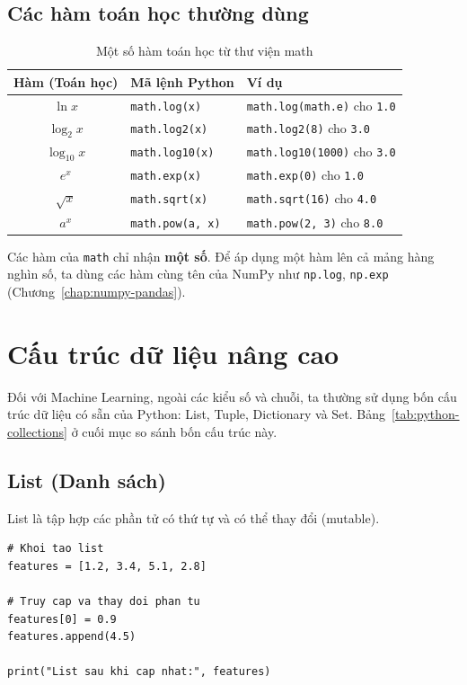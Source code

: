 \subsection{Các hàm toán học thường dùng}
\begin{table}[H]
\centering
\begin{tabular}{|c|l|l|}
\hline
\textbf{Hàm (Toán học)} & \textbf{Mã lệnh Python} & \textbf{Ví dụ} \\
\hline
$\ln x$ & \texttt{math.log(x)} & \texttt{math.log(math.e)} cho \texttt{1.0} \\
\hline
$\log_2 x$ & \texttt{math.log2(x)} & \texttt{math.log2(8)} cho \texttt{3.0} \\
\hline
$\log_{10} x$ & \texttt{math.log10(x)} & \texttt{math.log10(1000)} cho \texttt{3.0} \\
\hline
$e^x$ & \texttt{math.exp(x)} & \texttt{math.exp(0)} cho \texttt{1.0} \\
\hline
$\sqrt{x}$ & \texttt{math.sqrt(x)} & \texttt{math.sqrt(16)} cho \texttt{4.0} \\
\hline
$a^x$ & \texttt{math.pow(a, x)} & \texttt{math.pow(2, 3)} cho \texttt{8.0} \\
\hline
\end{tabular}
\caption{Một số hàm toán học từ thư viện math}
\end{table}

Các hàm của \texttt{math} chỉ nhận \textbf{một số}. Để áp dụng một hàm lên cả mảng hàng nghìn số, ta dùng các hàm cùng tên của NumPy như \texttt{np.log}, \texttt{np.exp} (Chương~\ref{chap:numpy-pandas}).

\section{Cấu trúc dữ liệu nâng cao}

Đối với Machine Learning, ngoài các kiểu số và chuỗi, ta thường sử dụng bốn cấu trúc dữ liệu có sẵn của Python: List, Tuple, Dictionary và Set. Bảng~\ref{tab:python-collections} ở cuối mục so sánh bốn cấu trúc này.

\subsection{List (Danh sách)}
List là tập hợp các phần tử có thứ tự và có thể thay đổi (mutable).

\begin{lstlisting}[caption={Thao tác cơ bản trên List}]
# Khoi tao list
features = [1.2, 3.4, 5.1, 2.8]

# Truy cap va thay doi phan tu
features[0] = 0.9
features.append(4.5)

print("List sau khi cap nhat:", features)
\end{lstlisting}

